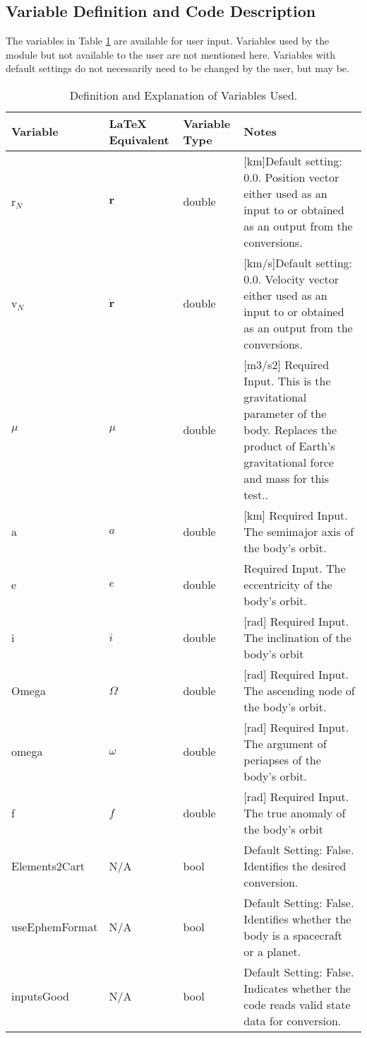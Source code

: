 \subsection{Variable Definition and Code Description}
The variables in Table \ref{tabular:vars} are available for user input. Variables used by the module but not available to the user are not mentioned here. Variables with default settings do not necessarily need to be changed by the user, but may be.
\begin{table}[H]
	\caption{Definition and Explanation of Variables Used.}
	\label{tab:errortol}
	\centering \fontsize{10}{10}\selectfont
	\begin{tabular}{  m{3cm}| m{3cm} | m{3cm} | m{6cm} } %
		\hline
		\textbf{Variable}   							& \textbf{LaTeX Equivalent} 	&		\textbf{Variable Type} & \textbf{Notes}			  \\ \hline
		r$_N$	&$\bm{r}$ & double & [km]Default setting: 0.0. Position vector either used as an input to or obtained as an output from the conversions.\\ \hline
		v$_N$	& $\bm{\dot{r}}$ & double & [km/s]Default setting: 0.0. Velocity vector either used as an input to or obtained as an output from the conversions.\\ 
		\hline
		$\mu$	& $\mu$ & double & [m3/s2] Required Input. This is the gravitational parameter of the body. Replaces the product of Earth's gravitational force and mass for this test..\\
		\hline
		a & $a$ & double & [km] Required Input. The semimajor axis of the body's orbit.\\ 
		\hline
		e & $e$ & double & Required Input. The eccentricity of the body's orbit.\\ 
		\hline
		i & $i$ & double & [rad] Required Input. The inclination of the body's orbit\\ 
		\hline
		Omega & $\Omega$ & double & [rad] Required Input. The ascending node of the body's orbit. \\ 
		\hline
		omega & $\omega$ & double & [rad] Required Input. The argument of periapses of the body's orbit. \\ 
		\hline
		f & $f$ & double & [rad] Required Input. The true anomaly of the body's orbit \\
		\hline
		Elements2Cart & N/A & bool & Default Setting: False. Identifies the desired conversion. \\ 
		\hline
		useEphemFormat & N/A & bool & Default Setting: False. Identifies whether the body is a spacecraft or a planet.\\
		\hline
		inputsGood & N/A & bool & Default Setting: False. Indicates whether the code reads valid state data for conversion.\\
		\hline
	\end{tabular}
	\label{tabular:vars}
\end{table}
